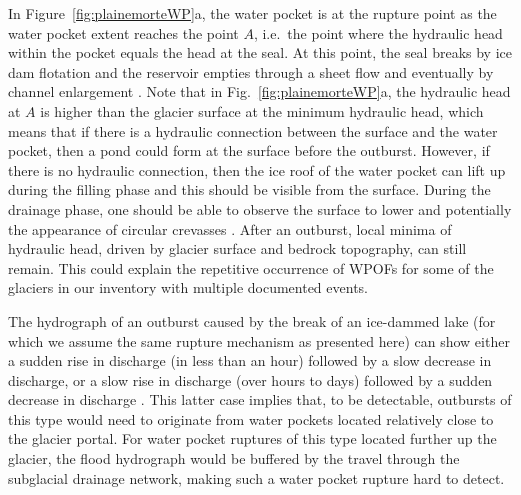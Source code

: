 In Figure~\ref{fig:plainemorteWP}a, the water pocket is at the rupture point as the water pocket extent reaches the point $A$, i.e.\ the point where the hydraulic head within the pocket equals the head at the seal. At this point, the seal breaks by ice dam flotation and the reservoir empties through a sheet flow and eventually by channel enlargement \citep[this is similar to ice-marginal and subglacial lakes outburst floods mechanisms, see][]{Bjornsson2010}. Note that in Fig.~\ref{fig:plainemorteWP}a, the hydraulic head at $A$ is higher than the glacier surface at the minimum hydraulic head, which means that if there is a hydraulic connection between the surface and the water pocket, then a pond could form at the surface before the outburst. However, if there is no hydraulic connection, then the ice roof of the water pocket can lift up during the filling phase and this should be visible from the surface. During the drainage phase, one should be able to observe the surface to lower and potentially the appearance of circular crevasses \citep[e.g.][]{Konrad1998}. After an outburst, local minima of hydraulic head, driven by glacier surface and bedrock topography, can still remain. This could explain the repetitive occurrence of WPOFs for some of the glaciers in our inventory with multiple documented events. 

The hydrograph of an outburst caused by the break of an ice-dammed lake (for which we assume the same rupture mechanism as presented here) can show either a sudden rise in discharge (in less than an hour) followed by a slow decrease in discharge, or a slow rise in discharge (over hours to days) followed by a sudden decrease in discharge \citep[see schematic hydrographs of Fig. 4 in][]{Roberts2005}. This latter case implies that, to be detectable, outbursts of this type would need to originate from water pockets located relatively close to the glacier portal. For water pocket ruptures of this type located further up the glacier, the flood hydrograph would be buffered by the travel through the subglacial drainage network, making such a water pocket rupture hard to detect. 


